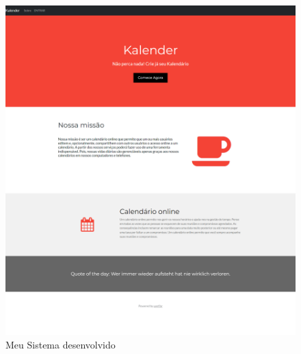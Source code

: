 \begin{figure}[H]
    \begin{center}
        \includegraphics[width=12cm]{Pictures/interface/home.png}
        \caption{Meu Sistema desenvolvido} \label{sistema}
    \end{center}
\end{figure}
